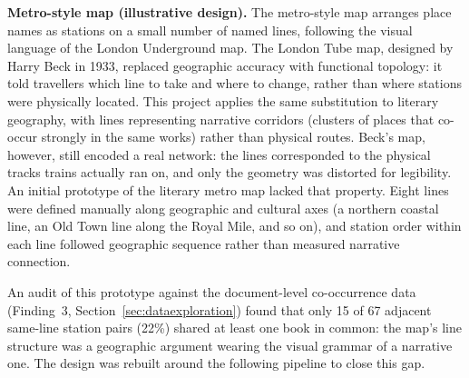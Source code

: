 \documentclass[logo,msc]{infthesis}
\begin{document}
\textbf{Metro-style map (illustrative design).} The metro-style map arranges place names as stations on a small number of named lines, following the visual language of the London Underground map. The London Tube map, designed by Harry Beck in 1933, replaced geographic accuracy with functional topology: it told travellers which line to take and where to change, rather than where stations were physically located. This project applies the same substitution to literary geography, with lines representing narrative corridors (clusters of places that co-occur strongly in the same works) rather than physical routes. Beck's map, however, still encoded a real network: the lines corresponded to the physical tracks trains actually ran on, and only the geometry was distorted for legibility. An initial prototype of the literary metro map lacked that property. Eight lines were defined manually along geographic and cultural axes (a northern coastal line, an Old Town line along the Royal Mile, and so on), and station order within each line followed geographic sequence rather than measured narrative connection.

\label{sec:metro-redesign}
An audit of this prototype against the document-level co-occurrence data (Finding~3, Section~\ref{sec:dataexploration}) found that only 15 of 67 adjacent same-line station pairs (22\%) shared at least one book in common: the map's line structure was a geographic argument wearing the visual grammar of a narrative one. The design was rebuilt around the following pipeline to close this gap.
\end{document}
